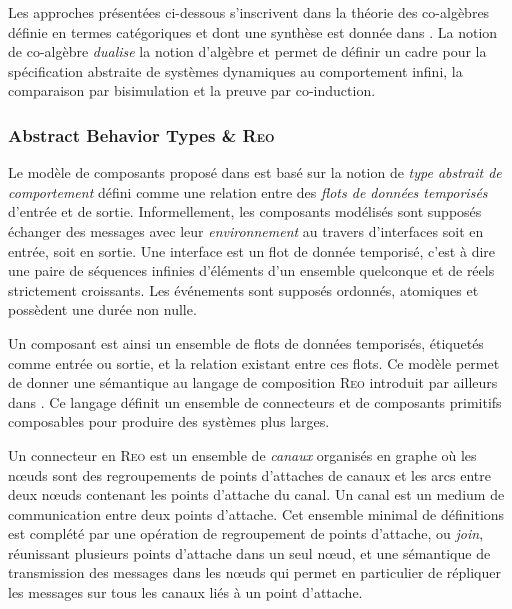 Les approches pr\'esent\'ees ci-dessous s'inscrivent dans la
th\'eorie des co-alg\`ebres d\'efinie en termes cat\'egoriques et
dont une synth\`ese est donn\'ee  dans \cite{coalgebra-tutorial}. La
notion de co-alg\`ebre \emph{dualise} la notion d'alg\`ebre et
permet de d\'efinir un cadre pour la sp\'ecification abstraite de
syst\`emes dynamiques au comportement infini, la comparaison par bisimulation et la preuve
par co-induction.

\subsubsection{Abstract Behavior Types \& \textsc{Reo}}

Le mod\`ele de composants propos\'e dans \cite{ABT} est bas\'e sur
la notion de \emph{type abstrait de comportement} d\'efini comme une
relation entre des \emph{flots de donn\'ees temporis\'es}
d'entr\'ee et de sortie. Informellement, les composants
mod\'elis\'es sont suppos\'es \'echanger des messages avec
leur \emph{environnement} au travers d'interfaces soit en entr\'ee,
soit en sortie. Une interface est un flot
de donn\'ee temporis\'e, c'est \`a dire une paire de s\'equences
infinies d'\'el\'ements d'un ensemble quelconque et
de r\'eels strictement croissants. Les
\'ev\'enements sont suppos\'es ordonn\'es, atomiques et
poss\`edent une dur\'ee non nulle. 

Un composant est ainsi un ensemble de flots de donn\'ees temporis\'es,
\'etiquet\'es comme entr\'ee ou sortie, et la relation existant
entre ces flots. Ce mod\`ele permet de donner une s\'emantique au
langage de composition \textsc{Reo} introduit par ailleurs dans
\cite{constraint-automata}.  Ce langage d\'efinit un ensemble de connecteurs
et de composants primitifs composables pour produire des syst\`emes plus larges. 

Un connecteur en \textsc{Reo} est un ensemble de \emph{canaux}
organis\'es en graphe o\`u les n\oe uds sont des regroupements de
points d'attaches de canaux et les arcs  entre deux n\oe uds
contenant les points d'attache du canal. Un canal est un medium de
communication entre deux points d'attache. Cet ensemble minimal de
d\'efinitions est compl\'et\'e par une op\'eration de regroupement
de points d'attache, ou \emph{join}, r\'eunissant plusieurs points
d'attache dans un seul n\oe ud, et une s\'emantique de transmission
des messages dans les n\oe uds qui permet en particulier de
r\'epliquer les messages sur tous les canaux li\'es \`a un point
d'attache.

